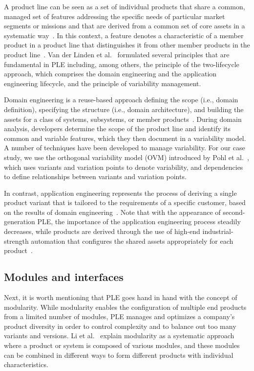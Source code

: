 \documentclass[sigconf,review]{acmart}
\begin{document}
A product line can be seen as a set of individual products that share a common, managed set of features addressing the specific needs of particular market segments or missions and that are derived from a common set of core assets in a systematic way~\cite{Clements_2002}.
In this context, a feature denotes a characteristic of a member product in a product line that distinguishes it from other member products in the product line~\cite{ISO/IEC_26550}.
Van der Linden et al.~\cite{Linden_2007} formulated several principles that are fundamental in PLE including, among others, the principle of the two-lifecycle approach, which comprises the domain engineering and the application engineering lifecycle, and the principle of variability management.

Domain engineering is a reuse-based approach defining the scope (i.e., domain definition), specifying the structure (i.e., domain architecture), and building the assets for a class of systems, subsystems, or member products~\cite{ISO/IEC_26550}.
During domain analysis, developers determine the scope of the product line and identify its common and variable features, which they then document in a variability model. 
A number of techniques have been developed to manage variability.
For our case study, we use the orthogonal variability model (OVM) introduced by Pohl et al.~\cite{Pohl_2005}, which uses variants and variation points to denote variability, and dependencies to define relationships between variants and variation points.

In contrast, application engineering represents the process of deriving a single product variant that is tailored to the requirements of a specific customer, based on the results of domain engineering~\cite{Kästner_2013}. 
Note that with the appearance of second-generation PLE, the importance of the application engineering process steadily decreases, while products are derived through the use of high-end industrial-strength automation that configures the shared assets appropriately for each product~\cite{Krueger_2013}.

\subsection{Modules and interfaces}
\label{sec:modules}

Next, it is worth mentioning that PLE goes hand in hand with the concept of modularity.
While modularity enables the configuration of multiple end products from a limited number of modules, PLE manages and optimizes a company's product diversity in order to control complexity and to balance out too many variants and versions.
Li et al.~\cite{Li_2019} explain modularity as a systematic approach where a product or system is composed of various modules, and these modules can be combined in different ways to form different products with individual characteristics.
\end{document}
